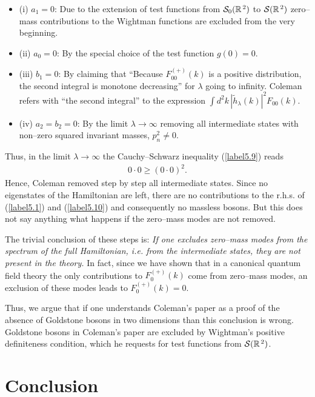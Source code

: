 \documentclass[a4paper,12pt] {article}
\begin{document}
\begin{itemize}
\item (i) $a_1 = 0$: Due to the extension of test functions from
${\cal S}_0(\mathbb{R}^{\,2})$ to ${\cal S}(\mathbb{R}^{\,2})$
zero--mass contributions to the Wightman functions are excluded from
the very beginning.
\item (ii) $a_0 = 0$: By the special choice of the test function $g(0)
= 0$.
\item (iii) $b_1 = 0$: By claiming that ``Because $F^{(+)}_{00}(k)$ is
a positive distribution, the second integral is monotone decreasing''
for $\lambda$ going to infinity. Coleman refers with ``the second
integral'' to the expression $\int
d^2k\,|\tilde{h}_{\lambda}(k)|^2F_{00}(k)$.
\item (iv) $a_2 = b_2 = 0$: By the limit $\lambda \to \infty$
removing all intermediate states with non--zero squared invariant
masses, $p^2_n\neq 0$. 
\end{itemize}

Thus, in the limit $\lambda \to \infty$ the Cauchy--Schwarz inequality
(\ref{label5.9}) reads
%
\begin{eqnarray}\label{label5.10}
0\cdot0 \ge (0\cdot 0)^2 .
\end{eqnarray}
%
Hence, Coleman removed step by step all intermediate states. Since no
eigenstates of the Hamiltonian are left, there are no contributions to
the r.h.s. of (\ref{label5.1}) and (\ref{label5.10}) and consequently
no massless bosons.  But this does not say anything what happens if the
zero--mass modes are not removed.

The trivial conclusion of these steps is: {\it If one excludes
zero--mass modes from the spectrum of the full Hamiltonian, i.e. from
the intermediate states, they are not present in the theory.} In fact,
since we have shown that in a canonical quantum field theory the only
contributions to $F^{(+)}_0(k)$ come from zero--mass modes, an
exclusion of these modes leads to $F^{(+)}_0(k) = 0$.

Thus, we argue that if one understands Coleman's paper as a proof of
the absence of Goldstone bosons in two dimensions than this conclusion
is wrong.  Goldstone bosons in Coleman's paper are excluded by
Wightman's positive definiteness condition, which he requests for test
functions from ${\cal S}(\mathbb{R}^{\,2})$.


\section{Conclusion}
\setcounter{equation}{0}
\end{document}
